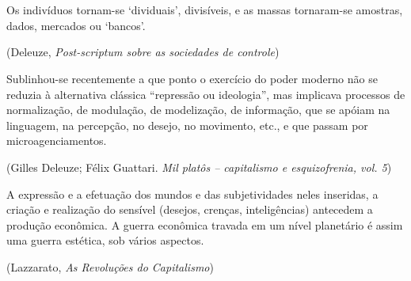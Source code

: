 \chapter*{}

\vspace*{\fill}

\thispagestyle{empty}

\epigraph{Os indivíduos tornam-se `dividuais', divisíveis, e as massas
tornaram-se amostras, dados, mercados ou `bancos'.}{(Deleuze, \emph{Post-scriptum sobre as sociedades de controle})}

\epigraph{Sublinhou-se recentemente a que ponto o exercício do poder moderno não
se reduzia à alternativa clássica ``repressão ou ideologia'', mas
implicava processos de normalização, de modulação, de modelização, de
informação, que se apóiam na linguagem, na percepção, no desejo, no
movimento, etc., e que passam por microagenciamentos.}{(Gilles Deleuze; Félix Guattari. \emph{Mil platôs -- capitalismo e esquizofrenia, vol. 5})}

\epigraph{A expressão e a efetuação dos mundos e das subjetividades neles
inseridas, a criação e realização do sensível (desejos, crenças,
inteligências) antecedem a produção econômica. A guerra econômica
travada em um nível planetário é assim uma guerra estética, sob vários
aspectos.}{(Lazzarato, \emph{As Revoluções do Capitalismo})}

